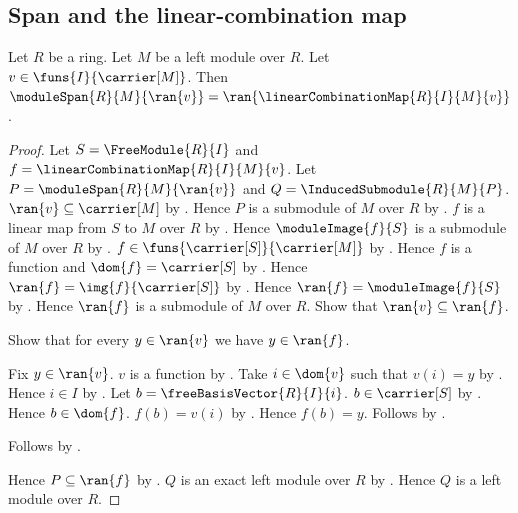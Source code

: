 \subsection{Span and the linear-combination map}

\begin{theorem}\label{indexed_family_span_eq_linear_combination_range}
    Let $R$ be a ring.
    Let $M$ be a left module over $R$.
    Let $v\in\funs{I}{\carrier[M]}$.
    Then
        $\moduleSpan{R}{M}{\ran{v}}
            =\ran{\linearCombinationMap{R}{I}{M}{v}}$.
\end{theorem}
\begin{proof}
    Let $S=\FreeModule{R}{I}$ and
        $f=\linearCombinationMap{R}{I}{M}{v}$.
    Let $P=\moduleSpan{R}{M}{\ran{v}}$ and
        $Q=\InducedSubmodule{R}{M}{P}$.
    $\ran{v}\subseteq\carrier[M]$ by .
    Hence $P$ is a submodule of $M$ over $R$ by
        .
    $f$ is a linear map from $S$ to $M$ over $R$ by
        .
    Hence $\moduleImage{f}{S}$ is a submodule of $M$ over $R$ by
        .
    $f\in\funs{\carrier[S]}{\carrier[M]}$ by
        .
    Hence $f$ is a function and $\dom{f}=\carrier[S]$ by
        .
    Hence $\ran{f}=\img{f}{\carrier[S]}$ by .
    Hence $\ran{f}=\moduleImage{f}{S}$ by
        .
    Hence $\ran{f}$ is a submodule of $M$ over $R$.
    Show that $\ran{v}\subseteq\ran{f}$.
    \begin{subproof}
        Show that for every $y\in\ran{v}$ we have $y\in\ran{f}$.
        \begin{subproof}
            Fix $y\in\ran{v}$.
            $v$ is a function by .
            Take $i\in\dom{v}$ such that $v(i)=y$ by
                .
            Hence $i\in I$ by .
            Let $b=\freeBasisVector{R}{I}{i}$.
            $b\in\carrier[S]$ by .
            Hence $b\in\dom{f}$.
            $f(b)=v(i)$ by
                .
            Hence $f(b)=y$.
            Follows by .
        \end{subproof}
        Follows by .
    \end{subproof}
    Hence $P\subseteq\ran{f}$ by .
    $Q$ is an exact left module over $R$ by
        .
    Hence $Q$ is a left module over $R$.

\end{proof}
